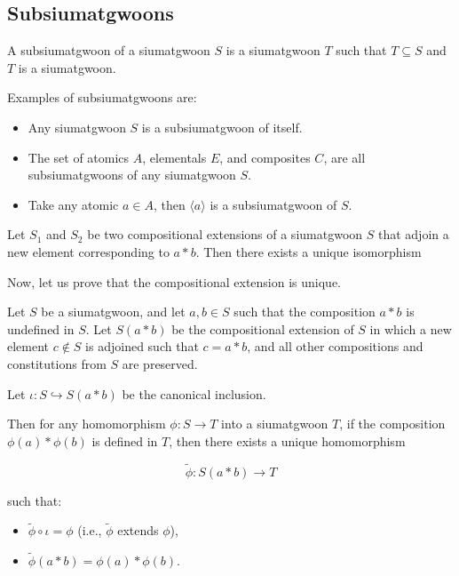 \subsection{Subsiumatgwoons}

\begin{definition}[Subsiumatgwoon]
    A subsiumatgwoon of a siumatgwoon $S$ is a siumatgwoon $T$ such that $T \subseteq S$ and $T$ is a siumatgwoon.
\end{definition}

Examples of subsiumatgwoons are:
\begin{itemize}
    
    \item Any siumatgwoon $S$ is a subsiumatgwoon of itself.
    \item The set of atomics $A$, elementals $E$, and composites $C$, are all subsiumatgwoons of any siumatgwoon $S$.
    \item Take any atomic $a \in A$, then $\langle a \rangle$ is a subsiumatgwoon of $S$.
    
\end{itemize}






\begin{theorem}
    Let $S_1$ and $S_2$ be two compositional extensions of a siumatgwoon $S$ that adjoin a new element corresponding to $a * b$. Then there exists a unique isomorphism
\end{theorem}


Now, let us prove that the compositional extension is unique. 

\begin{theorem}
Let $S$ be a siumatgwoon, and let $a, b \in S$ such that the composition $a * b$ is undefined in $S$. Let $S(a * b)$ be the compositional extension of $S$ in which a new element $c \notin S$ is adjoined such that $c = a * b$, and all other compositions and constitutions from $S$ are preserved.

Let $\iota: S \hookrightarrow S(a*b)$ be the canonical inclusion.

Then for any homomorphism $\phi: S \to T$ into a siumatgwoon $T$, if the composition $\phi(a) * \phi(b)$ is defined in $T$, then there exists a unique homomorphism

$$
\widetilde{\phi}: S(a*b) \to T
$$

such that:
\begin{itemize}
\item $\widetilde{\phi} \circ \iota = \phi$ (i.e., $\widetilde{\phi}$ extends $\phi$),
\item $\widetilde{\phi}(a * b) = \phi(a) * \phi(b)$.
\end{itemize}
\end{theorem}

